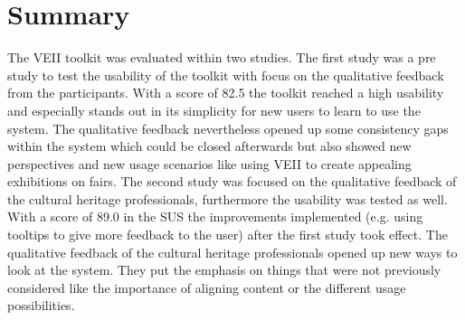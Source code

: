 \section{Summary}
The VEII toolkit was evaluated within two studies. The first study was a pre study to test the usability of the toolkit with focus on the qualitative feedback from the participants. With a score of 82.5 the toolkit reached a high usability and especially stands out in its simplicity for new users to learn to use the system. The qualitative feedback nevertheless opened up some consistency gaps within the system which could be closed afterwards but also showed new perspectives and new usage scenarios like using VEII to create appealing exhibitions on fairs.
The second study was focused on the qualitative feedback of the cultural heritage professionals, furthermore the usability was tested as well. With a score of 89.0 in the SUS the improvements implemented (e.g. using tooltips to give more feedback to the user) after the first study took effect. The qualitative feedback of the cultural heritage professionals opened up new ways to look at the system. They put the emphasis on things that were not previously considered like the importance of aligning content or the different usage possibilities.